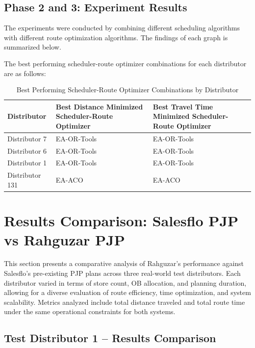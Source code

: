 \subsection{Phase 2 and 3: Experiment Results}
The experiments were conducted by combining different scheduling algorithms with different route optimization algorithms. The findings of each graph is summarized below.



The best performing scheduler-route optimizer combinations for each distributor are as follows:

\begin{table}[H]
    \centering
    \renewcommand{\arraystretch}{1.3}
    \caption{Best Performing Scheduler-Route Optimizer Combinations by Distributor}
    \begin{tabular}{|>{\centering\arraybackslash}p{4cm}@{\hskip 0.5cm}|>{\centering\arraybackslash}p{5cm}@{\hskip 0.5cm}|>{\centering\arraybackslash}p{5cm}|}
    \hline
    \textbf{Distributor} & \textbf{Best Distance Minimized Scheduler-Route Optimizer} & \textbf{Best Travel Time Minimized Scheduler-Route Optimizer} \\
    \hline
    Distributor 7 & EA-OR-Tools & EA-OR-Tools \\
    Distributor 6 & EA-OR-Tools & EA-OR-Tools \\
    Distributor 1 & EA-OR-Tools & EA-OR-Tools \\
    Distributor 131 & EA-ACO & EA-ACO \\
    \hline
    \end{tabular}
    \label{tab:best_schedulers}
\end{table}


    
\section{Results Comparison: Salesflo PJP vs Rahguzar PJP}

This section presents a comparative analysis of Rahguzar's performance against Salesflo's pre-existing PJP plans across three real-world test distributors. Each distributor varied in terms of store count, OB allocation, and planning duration, allowing for a diverse evaluation of route efficiency, time optimization, and system scalability. Metrics analyzed include total distance traveled and total route time under the same operational constraints for both systems.

\subsection{Test Distributor 1 – Results Comparison}

